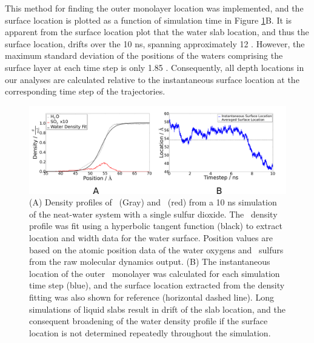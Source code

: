 \documentclass{article}
\begin{document}
This method for finding the outer monolayer location was implemented, and the surface location is plotted as a function of simulation time in Figure \ref{fig:density-flaw}B. It is apparent from the surface location plot that the water slab location, and thus the surface location, drifts over the 10 ns, spanning approximately 12 \angs. However, the maximum standard deviation of the positions of the waters comprising the surface layer at each time step is only 1.85 \angs. Consequently, all depth locations in our analyses are calculated relative to the instantaneous surface location at the corresponding time step of the trajectories.

\begin{figure}[h!]
	\begin{center}
		\includegraphics[scale=1.0]{density-location.png}
		\caption{(A) Density profiles of \wat~(Gray) and \suldiox~(red) from a 10 ns simulation of the neat-water system with a single sulfur dioxide. The \wat~density profile was fit using a hyperbolic tangent function (black) to extract location and width data for the water surface. Position values are based on the atomic position data of the water oxygens and \suldiox~sulfurs from the raw molecular dynamics output. (B) The instantaneous location of the outer \wat~monolayer was calculated for each simulation time step (blue), and the surface location extracted from the density fitting was also shown for reference (horizontal dashed line). Long simulations of liquid slabs result in drift of the slab location, and the consequent broadening of the water density profile if the surface location is not determined repeatedly throughout the simulation.}
		\label{fig:density-flaw}
	\end{center}
\end{figure}


\end{document}
